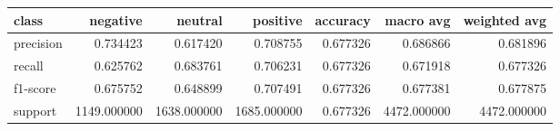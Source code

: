 \begin{tabular}{lrrrrrr}
\toprule
class & negative & neutral & positive & accuracy & macro avg & weighted avg \\
\midrule
precision & 0.734423 & 0.617420 & 0.708755 & 0.677326 & 0.686866 & 0.681896 \\
recall & 0.625762 & 0.683761 & 0.706231 & 0.677326 & 0.671918 & 0.677326 \\
f1-score & 0.675752 & 0.648899 & 0.707491 & 0.677326 & 0.677381 & 0.677875 \\
support & 1149.000000 & 1638.000000 & 1685.000000 & 0.677326 & 4472.000000 & 4472.000000 \\
\bottomrule
\end{tabular}
